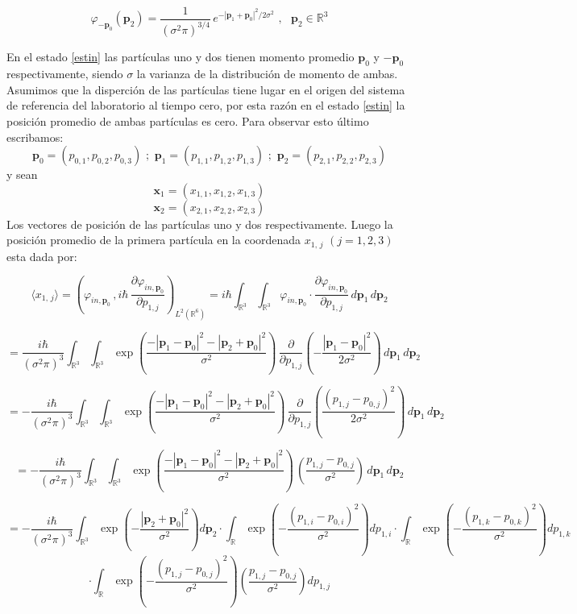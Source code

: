 \documentclass[12pt]{book}
\numberwithin{equation}{chapter}
\def\v{\mathbf}
\def\R{\mathbb{R}}
\def\vp{\varphi}
\def\P{\mathbf{p}}
\begin{document}
\begin{equation}\label{estin2}
\vp_{-\P_{0}}(\P_{2})= \frac{1}{( \sigma^{2} \pi )^{3/4}}\,
e^{-| \P_{1} + \P_{0} |^{2}/2 \sigma^{2}} \,\,,\,\,\,\, \P_{2} \in \R^{3}
\end{equation}

En el estado \eqref{estin} las part\'iculas uno y dos tienen momento promedio $\P_{0}$ y $-\P_{0}$ respectivamente, siendo $\sigma$ la varianza de la distribuci\'on de momento de ambas.\\
Asumimos que la disperci\'on de las part\'iculas tiene lugar en el origen del sistema de referencia del laboratorio al tiempo cero, por esta raz\'on en el estado \eqref{estin} la posici\'on promedio de ambas part\'iculas es cero. Para observar esto \'ultimo escribamos:
$$ \P_{0}=( p_{0,1},p_{0,2},p_{0,3} ) \,\,;\,\, \P_{1}=( p_{1,1},p_{1,2},p_{1,3} ) \,\,;\,\, \P_{2}=( p_{2,1},p_{2,2},p_{2,3} ) $$
y sean
$$ \v{x}_{1}= ( x_{1,1},x_{1,2},x_{1,3} ) $$
$$ \v{x}_{2}= ( x_{2,1},x_{2,2},x_{2,3} ) $$
Los vectores de posici\'on de las part\'iculas uno y dos respectivamente.
Luego la posici\'on promedio de la primera part\'icula en la coordenada $x_{1,\,j}$  $(j=1,2,3)$ esta dada por:

$$ \langle x_{1,\,j} \rangle= \left(\vp_{in,\P_{0} }\, , i\hbar\, \frac{\partial \vp_{in,\P_{0} } }{\partial p_{1,j}}   \right)_{ L^{2}(\R^{6}) }= i \hbar \int_{\R^{3}} \int_{\R^{3}} \vp_{in,\P_{0} } \cdot \frac{\partial \vp_{in,\P_{0} } }{\partial p_{1,j}} \, d\P_{1}\, d\P_{2} $$

$$ =\frac{i \hbar}{(\sigma^{2} \pi)^{3}} \int_{\R^{3}} \int_{\R^{3}} \exp \left( \frac{ -|\P_{1}-\P_{0}|^{2}-|\P_{2}+\P_{0}|^{2} }{\sigma^{2}} \right)\, \frac{\partial}{\partial p_{1,j}} \left( -\frac{|\P_{1}-\P_{0}|^{2}}{2 \sigma^{2}} \right) \, d\P_{1}\, d\P_{2}  $$

$$ =-\frac{i \hbar}{(\sigma^{2} \pi)^{3}} \int_{\R^{3}} \int_{\R^{3}} \exp \left( \frac{ -|\P_{1}-\P_{0}|^{2}-|\P_{2}+\P_{0}|^{2} }{\sigma^{2}} \right)\, \frac{\partial}{\partial p_{1,j}} \left( \frac{ ( p_{1,j}-p_{0,j} )^{2} }{2 \sigma^{2}} \right) \, d\P_{1}\, d\P_{2}  $$

$$ =-\frac{i \hbar}{(\sigma^{2} \pi)^{3}} \int_{\R^{3}} \int_{\R^{3}} \exp \left( \frac{ -|\P_{1}-\P_{0}|^{2}-|\P_{2}+\P_{0}|^{2} }{\sigma^{2}} \right)\,  \left( \frac{ p_{1,j}-p_{0,j} }{\sigma^{2}} \right) \, d\P_{1}\, d\P_{2}  $$

$$ =-\frac{i \hbar}{(\sigma^{2} \pi)^{3}} \int_{\R^{3}} \exp \left( -\frac{|\P_{2}+\P_{0}|^{2}}{\sigma^{2}} \right)  d\P_{2} \cdot \int_{\R} \exp \left( -\frac{( p_{1,i}-p_{0,i} )^{2}}{\sigma^{2}} \right) dp_{1,i} \cdot \int_{\R} \exp \left( -\frac{( p_{1,k}-p_{0,k} )^{2}}{\sigma^{2}} \right) dp_{1,k}  $$
$$ \cdot \int_{\R} \exp \left( -\frac{( p_{1,j}-p_{0,j} )^{2}}{\sigma^{2}} \right)  \left( \frac{ p_{1,j}-p_{0,j} }{\sigma^{2}} \right) dp_{1,j} $$
\end{document}
